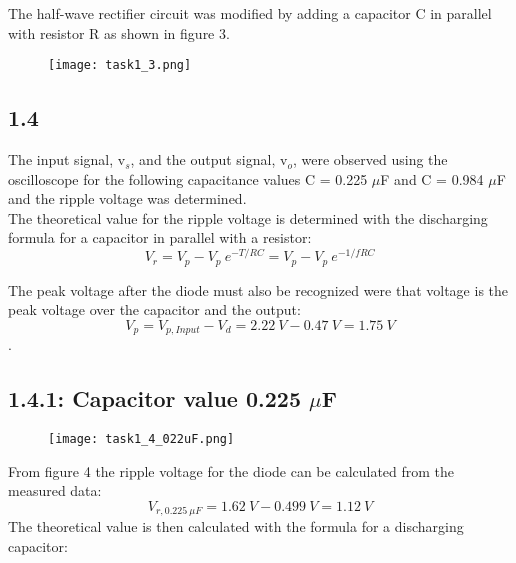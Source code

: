    The half-wave rectifier circuit was modified by adding a capacitor C in parallel with resistor R as shown in figure 3.

    \begin{figure}[h!]
        \centering
        \texttt{[image: task1\_3.png]}
    \end{figure}

\subsection*{1.4}
    
    The input signal, v$_s$, and the output signal, v$_o$, were observed using the oscilloscope for the following capacitance values C = 0.225 $\mu$F and C = 0.984 $\mu$F and the ripple voltage was determined.\\
    
    The theoretical value for the ripple voltage is determined with the discharging formula for a capacitor in parallel with a resistor:
    $$ V_r = V_p - V_p \ e^{-T/RC} =  V_p - V_p \ e^{-1/fRC}$$ 
    
    The peak voltage after the diode must also be recognized were that voltage is the peak voltage over the capacitor and the output:
     $$ V_p = V_{p,Input} - V_d = 2.22 \ V - 0.47 \ V = 1.75 \ V$$.

\subsection*{1.4.1: Capacitor value 0.225 \textbf{$\mu$}F}    
    \begin{figure}[h!]
        \centering
        \texttt{[image: task1\_4\_022uF.png]}
    \end{figure}
    
    From figure 4 the ripple voltage for the diode can be calculated from the measured data: $$ V_{r,0.225 \ \mu F} = 1.62 \ V - 0.499 \ V = 1.12 \ V $$
     The theoretical value is then calculated with the formula for a discharging capacitor:
    
